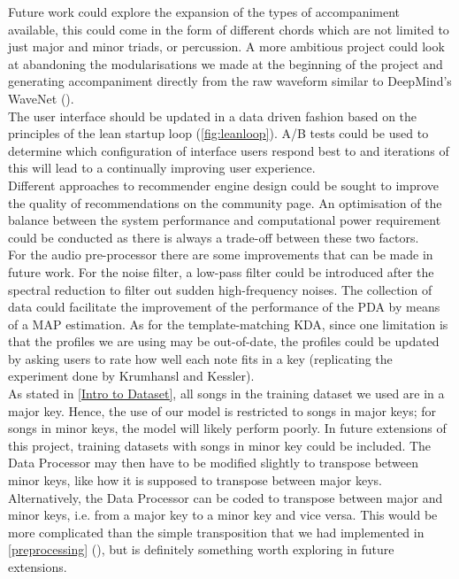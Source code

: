 Future work could explore the expansion of the types of accompaniment available, this could come in the form of different chords which are not limited to just major and minor triads, or percussion.
A more ambitious project could look at abandoning the modularisations we made at the beginning of the project and generating accompaniment directly from the raw waveform similar to DeepMind's WaveNet (\cite{wavenet}).
\\
The user interface should be updated in a data driven fashion based on the principles of the lean startup loop (\cref{fig:leanloop}). 
A/B tests could be used to determine which configuration of interface users respond best to and iterations of this will lead to a continually improving user experience.
\\
Different approaches to recommender engine design could be sought to improve the quality of recommendations on the community page. 
An optimisation of the balance between the system performance and computational power requirement could be conducted as there is always a trade-off between these two factors.
\\
For the audio pre-processor there are some improvements that can be made in future work. 
For the noise filter, a low-pass filter could be introduced after the spectral reduction to filter out sudden high-frequency noises. 
The collection of data could facilitate the improvement of the performance of the PDA by means of a MAP estimation. 
As for the template-matching KDA, since one limitation is that the profiles we are using may be out-of-date, the profiles could be updated by asking users to rate how well each note fits in a key (replicating the experiment done by Krumhansl and Kessler).
\\
As stated in \cref{Intro to Dataset}, all songs in the training dataset we used are in a major key. 
Hence, the use of our model is restricted to songs in major keys; for songs in minor keys, the model will likely perform poorly. 
In future extensions of this project, training datasets with songs in minor key could be included.
The Data Processor may then have to be modified slightly to transpose between minor keys, like how it is supposed to transpose between major keys. 
Alternatively, the Data Processor can be coded to transpose between major and minor keys, i.e. from a major key to a minor key and vice versa. 
This would be more complicated than the simple transposition that we had implemented in \cref{preprocessing} (\cite{BasicMusicTheoryBook}), but is definitely something worth exploring in future extensions. 
